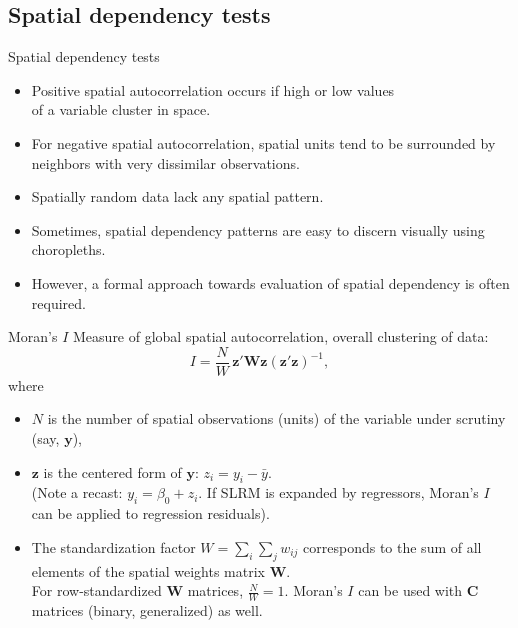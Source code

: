 \documentclass{beamer}
\begin{document}
\subsection{Spatial dependency tests}
\begin{frame}{Spatial dependency tests}
\begin{itemize}
    \item Positive spatial autocorrelation occurs if high or low values \\of a variable cluster in space. 
    \medskip
    \item For negative spatial autocorrelation, spatial units tend to be surrounded by neighbors with very dissimilar observations. 
    \medskip
    \item Spatially random data lack any spatial pattern.
    \medskip
    \item Sometimes, spatial dependency patterns are easy to discern visually using choropleths. 
    \medskip
    \item However, a formal approach towards evaluation of spatial dependency is often required.
\end{itemize}
\end{frame}
\begin{frame}{Moran's $I$}
Measure of global spatial autocorrelation, overall clustering of data:
\begin{equation*}
I = \frac{N}{W}\,\bm{z}'\bm{Wz}(\bm{z}'\bm{z})^{-1},
\end{equation*}     
where 
\begin{itemize}
    \item[] $N$ is the number of spatial observations (units) of the variable under scrutiny (say, $\bm{y}$),
    \smallskip
    \item[] $\bm{z}$ is the centered form of $\bm{y}$: $z_i = y_i - \bar{y}$.\\
    (Note a recast: $y_i = \beta_0 + z_i$. If SLRM is expanded by regressors, Moran's $I$ can be applied to regression residuals).
    \smallskip
    \item[] The standardization factor $W = \sum_{i}\sum_{j}w_{ij}$ corresponds to the sum of all elements of the spatial weights matrix $\bm{W}$. \\For row-standardized $\bm{W}$ matrices, $\tfrac{N}{W}=1$. Moran's $I$ can be used with $\bm{C}$ matrices (binary, generalized) as well.
\end{itemize}
\end{frame}
\end{document}
